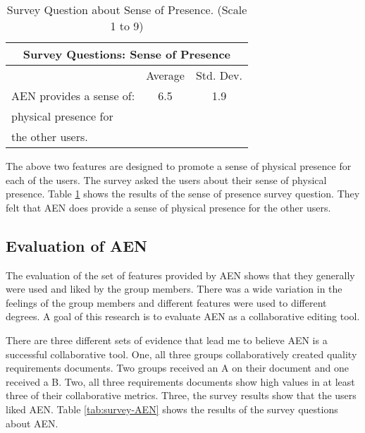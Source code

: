 \small
\begin{table}[htbp]
  \caption{Survey Question about Sense of Presence. (Scale 1 to 9)}
  \begin{center}
    \begin{tabular}{|l|c|c|}
      \hline
      \multicolumn{3}{|c|}{\rule[-3mm]{0mm}{8mm}\bf Survey Questions:
      Sense of Presence}\\ \hline
      &Average&Std. Dev.\\ \hline
      AEN provides a sense of:&6.5&1.9\\
      physical presence for&&\\
      the other users.&&\\\hline
    \end{tabular}
  \end{center}
  \label{tab:survey-Presence}
\end{table}
\normalsize

The above two features are designed to promote a sense of physical presence
for each of the users.  The survey asked the users about their sense of
physical presence.  Table \ref{tab:survey-Presence} shows the results of
the sense of presence survey question.  They felt that AEN does provide a
sense of physical presence for the other users.

\subsection{Evaluation of AEN}
\label{sec:eval-AEN}

The evaluation of the set of features provided by AEN shows that they
generally were used and liked by the group members.  There was a wide
variation in the feelings of the group members and different features were
used to different degrees.  A goal of this research is to evaluate AEN as a
collaborative editing tool.

There are three different sets of evidence that lead me to believe AEN is a
successful collaborative tool. One, all three groups collaboratively
created quality requirements documents. Two groups received an A on their
document and one received a B.  Two, all three requirements documents show
high values in at least three of their collaborative metrics.  Three, the
survey results show that the users liked AEN.  Table \ref{tab:survey-AEN}
shows the results of the survey questions about AEN.

